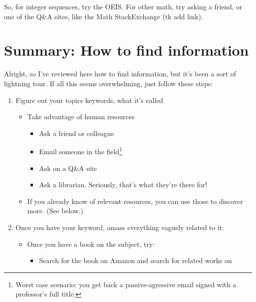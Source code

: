So, for integer sequences, try the OEIS. For other math, try asking a friend, or
one of the Q\&A sites, like the Math StackExchange (tk add link).

\section{Summary: How to find information}

Alright, so I've reviewed here how to find information, but it's been a sort of
lightning tour. If all this seems overwhelming, just follow these steps:

\begin{enumerate}
\item Figure out your topics keywords, what it's called
  \begin{itemize}
  \item Take advantage of human resources
    \begin{itemize}
    \item Ask a friend or colleague
    \item Email someone in the field\footnote{Worst case scenario: you get back a
      passive-agressive email signed with a professor's full title.}
    \item Ask on a Q\&A site
    \item Ask a librarian. Seriously, that's what they're there for!
    \end{itemize}
  \item If you already know of relevant resources, you can use those to discover
    more. (See below.)
  \end{itemize}
\item Once you have your keyword, amass everything vaguely related to it:
  \begin{itemize}
    \begin{itemize}
    \item Search for a textbook on the topic.
    \item Search for a review article on the textbook.
    \item Search for an annotated bibliography.
    \item Check the references on Wikipedia for your subject.
    \end{itemize}
  \item Once you have a book on the subject, try:
    \begin{itemize}
    \item Search for the book on Amazon and search for related works on

\end{itemize}
\end{itemize}
\end{enumerate}
